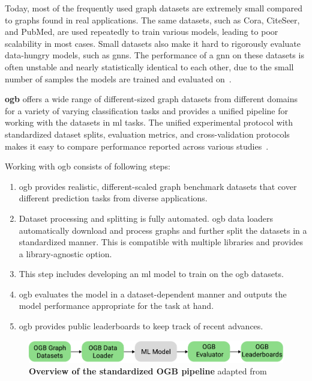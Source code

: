 Today, most of the frequently used graph datasets are extremely small compared to graphs found in real applications. The same datasets, such as Cora, CiteSeer, and PubMed, are used repeatedly to train various models, leading to poor scalability in most cases. Small datasets also make it hard to rigorously evaluate data-hungry models, such as \acfp{gnn}. The performance of a \ac{gnn} on these datasets is often unstable and nearly statistically identical to each other, due to the small number of samples the models are trained and evaluated on~\cite{Kipf2017,Xu2019, Hu2020}.

\textbf{\Ac{ogb}} offers a wide range of different-sized graph datasets from different domains for a variety of varying classification tasks and provides a unified pipeline for working with the datasets in \ac{ml} tasks.
The unified experimental protocol with standardized dataset splits, evaluation metrics, and cross-validation protocols makes it easy to compare performance reported across various studies~\cite{Hu2020}.

Working with \ac{ogb} consists of following steps:

\begin{enumerate}
    \item \Ac{ogb} provides realistic, different-scaled graph benchmark datasets that cover different prediction tasks from diverse applications.
    \item Dataset processing and splitting is fully automated. \Ac{ogb} data loaders automatically download and process graphs and further split the datasets in a standardized manner. This is compatible with multiple libraries and provides a library-agnostic option.
    \item This step includes developing an \ac{ml} model to train on the \ac{ogb} datasets.
    \item  \Ac{ogb} evaluates the model in a dataset-dependent manner and outputs the model performance appropriate for the task at hand.
    \item \Ac{ogb} provides public leaderboards to keep track of recent advances.
\end{enumerate}

\begin{figure}[H]
    \centering
    \includegraphics[width= 0.90\linewidth]{gfx/implementation/OGB_pipeline}
    \caption{\textbf{Overview of the standardized OGB pipeline} adapted from \cite{Hu2020}}\label{fig:implement:pipeline}
\end{figure}


